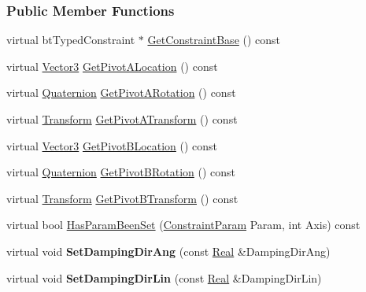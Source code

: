 \subsubsection*{Public Member Functions}
\begin{DoxyCompactItemize}
\item 
virtual btTypedConstraint $\ast$ \hyperlink{classMezzanine_1_1SliderConstraint_afb6bf65099b1d964975ee0853e81e38c}{GetConstraintBase} () const 
\item 
virtual \hyperlink{classMezzanine_1_1Vector3}{Vector3} \hyperlink{classMezzanine_1_1SliderConstraint_aab32a4c00eda5369c8188cff854418bd}{GetPivotALocation} () const 
\item 
virtual \hyperlink{classMezzanine_1_1Quaternion}{Quaternion} \hyperlink{classMezzanine_1_1SliderConstraint_ac53730c289d355e7ed426a9f4b28d6b5}{GetPivotARotation} () const 
\item 
virtual \hyperlink{classMezzanine_1_1Transform}{Transform} \hyperlink{classMezzanine_1_1SliderConstraint_ad87313a0848e2523b4157a07b0a65d23}{GetPivotATransform} () const 
\item 
virtual \hyperlink{classMezzanine_1_1Vector3}{Vector3} \hyperlink{classMezzanine_1_1SliderConstraint_af97a455a53d7572351f6ae725bb8e31b}{GetPivotBLocation} () const 
\item 
virtual \hyperlink{classMezzanine_1_1Quaternion}{Quaternion} \hyperlink{classMezzanine_1_1SliderConstraint_a4550412c47b611ae3238db1adbff20d9}{GetPivotBRotation} () const 
\item 
virtual \hyperlink{classMezzanine_1_1Transform}{Transform} \hyperlink{classMezzanine_1_1SliderConstraint_a22964857b7c94edf895d1ea9812614b1}{GetPivotBTransform} () const 
\item 
virtual bool \hyperlink{classMezzanine_1_1SliderConstraint_a348b148de3759ae80f7af6dbd8680867}{HasParamBeenSet} (\hyperlink{namespaceMezzanine_a6c62e8c2938fb203eb7a7072c12176f4}{ConstraintParam} Param, int Axis) const 
\item 
\hypertarget{classMezzanine_1_1SliderConstraint_a1aabc8e14b95c99374c1b2e408c6095e}{
virtual void {\bfseries SetDampingDirAng} (const \hyperlink{namespaceMezzanine_a726731b1a7df72bf3583e4a97282c6f6}{Real} \&DampingDirAng)}
\label{classMezzanine_1_1SliderConstraint_a1aabc8e14b95c99374c1b2e408c6095e}

\item 
\hypertarget{classMezzanine_1_1SliderConstraint_a1893c48fb1f5cd621e783ae80f7dfdf5}{
virtual void {\bfseries SetDampingDirLin} (const \hyperlink{namespaceMezzanine_a726731b1a7df72bf3583e4a97282c6f6}{Real} \&DampingDirLin)}
\label{classMezzanine_1_1SliderConstraint_a1893c48fb1f5cd621e783ae80f7dfdf5}


\end{DoxyCompactItemize}
